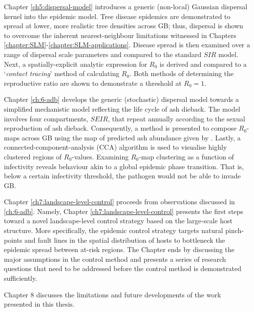 Chapter \ref{ch5:dispersal-model} introduces a generic (non-local) Gaussian dispersal kernel into the epidemic model. 
Tree disease epidemics are demonstrated to spread at lower, more realistic tree densities across GB; thus, dispersal is shown to overcome 
the inherent nearest-neighbour limitations witnessed in Chapters \ref{chapter:SLM}-\ref{chapter:SLM-applications}. Disease spread is then examined over a range of dispersal scale parameters and compared to the standard $SIR$ model. Next, a spatially-explicit analytic expression for $R_0$ is derived and compared to a `\textit{contact tracing}' method of calculating $R_0$.
Both methods of determining the reproductive ratio are shown to demonstrate a threshold at $R_0=1$.

Chapter \ref{ch:6-adb} develops the generic (stochastic) dispersal model towards a simplified mechanistic
model reflecting the life cycle of ash dieback. The model involves four compartments, $SEIR$, that repeat
annually according to the sexual reproduction of ash dieback. Consequently, a method is presented to compose $R_0$-maps
across GB using the map of predicted ash abundance given by \cite{hill.data}. Lastly, a connected-component-analysis
(CCA) algorithm is used to visualise highly clustered regions of $R_0$-values. Examining $R_0$-map clustering as a function
of infectivity reveals behaviour akin to a global epidemic phase transition. That is, below a certain infectivity threshold, 
the pathogen would not be able to invade GB.

Chapter \ref{ch7:landscape-level-control} proceeds from observations discussed in \ref{ch:6-adb}. 
Namely, Chapter \ref{ch7:landscape-level-control} presents the first steps toward a novel landscape-level
control strategy based on the large-scale host structure. More specifically, the epidemic control strategy targets
natural pinch-points and fault lines in the spatial distribution of hosts to bottleneck the epidemic
spread between at-risk regions. The Chapter ends by discussing the major assumptions in the control method and presents
a series of research questions that need to be addressed before the control method is demonstrated sufficiently.

Chapter 8 discusses the limitations and future developments of the work presented in this thesis.